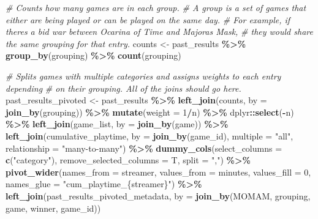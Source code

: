 \documentclass[
]{article}
\newenvironment{Shaded}{\begin{snugshade}}{\end{snugshade}}
\newcommand{\AttributeTok}[1]{\textcolor[rgb]{0.13,0.29,0.53}{#1}}
\newcommand{\CommentTok}[1]{\textcolor[rgb]{0.56,0.35,0.01}{\textit{#1}}}
\newcommand{\DecValTok}[1]{\textcolor[rgb]{0.00,0.00,0.81}{#1}}
\newcommand{\FunctionTok}[1]{\textcolor[rgb]{0.13,0.29,0.53}{\textbf{#1}}}
\newcommand{\NormalTok}[1]{#1}
\newcommand{\OtherTok}[1]{\textcolor[rgb]{0.56,0.35,0.01}{#1}}
\newcommand{\SpecialCharTok}[1]{\textcolor[rgb]{0.81,0.36,0.00}{\textbf{#1}}}
\newcommand{\StringTok}[1]{\textcolor[rgb]{0.31,0.60,0.02}{#1}}
\begin{document}
\begin{Shaded}
\begin{Highlighting}[]
\CommentTok{\# Counts how many games are in each group.}
\CommentTok{\# A group is a set of games that either are being played or can be played on the same day.}
\CommentTok{\# For example, if there\textquotesingle{}s a bid war between Ocarina of Time and Majora\textquotesingle{}s Mask,}
\CommentTok{\# they would share the same grouping for that entry.}
\NormalTok{counts }\OtherTok{\textless{}{-}}\NormalTok{ past\_results }\SpecialCharTok{\%\textgreater{}\%}
  \FunctionTok{group\_by}\NormalTok{(grouping) }\SpecialCharTok{\%\textgreater{}\%}
  \FunctionTok{count}\NormalTok{(grouping)}

\CommentTok{\# Splits games with multiple categories and assigns weights to each entry depending}
\CommentTok{\# on their grouping. All of the joins should go here.}
\NormalTok{past\_results\_pivoted }\OtherTok{\textless{}{-}}\NormalTok{ past\_results }\SpecialCharTok{\%\textgreater{}\%}
  \FunctionTok{left\_join}\NormalTok{(counts, }\AttributeTok{by =} \FunctionTok{join\_by}\NormalTok{(grouping)) }\SpecialCharTok{\%\textgreater{}\%}
  \FunctionTok{mutate}\NormalTok{(}\AttributeTok{weight =} \DecValTok{1}\SpecialCharTok{/}\NormalTok{n) }\SpecialCharTok{\%\textgreater{}\%}
\NormalTok{  dplyr}\SpecialCharTok{::}\FunctionTok{select}\NormalTok{(}\SpecialCharTok{{-}}\NormalTok{n) }\SpecialCharTok{\%\textgreater{}\%}
  \FunctionTok{left\_join}\NormalTok{(game\_list, }\AttributeTok{by =} \FunctionTok{join\_by}\NormalTok{(game)) }\SpecialCharTok{\%\textgreater{}\%}
  \FunctionTok{left\_join}\NormalTok{(cumulative\_playtime, }\AttributeTok{by =} \FunctionTok{join\_by}\NormalTok{(game\_id), }\AttributeTok{multiple =} \StringTok{"all"}\NormalTok{, }\AttributeTok{relationship =} \StringTok{"many{-}to{-}many"}\NormalTok{) }\SpecialCharTok{\%\textgreater{}\%}
  \FunctionTok{dummy\_cols}\NormalTok{(}\AttributeTok{select\_columns =} \FunctionTok{c}\NormalTok{(}\StringTok{"category"}\NormalTok{),}
             \AttributeTok{remove\_selected\_columns =}\NormalTok{ T,}
             \AttributeTok{split =} \StringTok{","}\NormalTok{) }\SpecialCharTok{\%\textgreater{}\%}
  \FunctionTok{pivot\_wider}\NormalTok{(}\AttributeTok{names\_from =}\NormalTok{ streamer, }\AttributeTok{values\_from =}\NormalTok{ minutes, }\AttributeTok{values\_fill =} \DecValTok{0}\NormalTok{,}
              \AttributeTok{names\_glue =} \StringTok{"cum\_playtime\_\{streamer\}"}\NormalTok{) }\SpecialCharTok{\%\textgreater{}\%}
  \FunctionTok{left\_join}\NormalTok{(past\_results\_pivoted\_metadata, }\AttributeTok{by =} \FunctionTok{join\_by}\NormalTok{(MOMAM, grouping, game, winner, game\_id))}



\end{Highlighting}
\end{Shaded}
\end{document}
